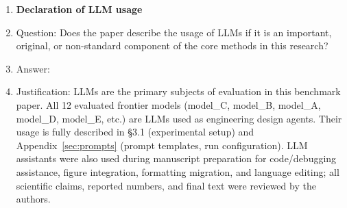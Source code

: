 \begin{enumerate}
\item {\bf Declaration of LLM usage}
    \item[] Question: Does the paper describe the usage of LLMs if it is an important, original, or non-standard component of the core methods in this research?
    \item[] Answer: \answerYes{}
    \item[] Justification: LLMs are the primary subjects of evaluation in this benchmark paper. All 12 evaluated frontier models (model_C, model_B, model_A, model_D, model_E, etc.) are LLMs used as engineering design agents. Their usage is fully described in §3.1 (experimental setup) and Appendix~\ref{sec:prompts} (prompt templates, run configuration). LLM assistants were also used during manuscript preparation for code/debugging assistance, figure integration, formatting migration, and language editing; all scientific claims, reported numbers, and final text were reviewed by the authors.

\end{enumerate}
